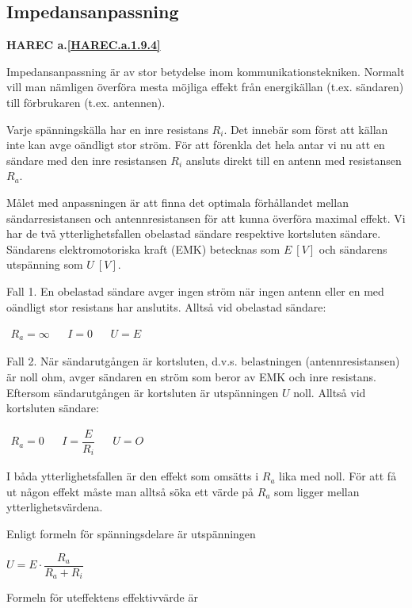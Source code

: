 \subsection{Impedansanpassning}
\textbf{HAREC a.\ref{HAREC.a.1.9.4}\label{myHAREC.a.1.9.4}}

Impedansanpassning är av stor betydelse inom kommunikationstekniken.
Normalt vill man nämligen överföra mesta möjliga effekt från energikällan
(t.ex. sändaren) till förbrukaren (t.ex. antennen).

Varje spänningskälla har en inre resistans \(R_i\). Det innebär som först att
källan inte kan avge oändligt stor ström. För att förenkla det hela antar vi nu
att en sändare med den inre resistansen \(R_i\) ansluts direkt till en antenn
med resistansen \(R_a\).

Målet med anpassningen är att finna det optimala förhållandet mellan
sändarresistansen och antennresistansen för att kunna överföra maximal effekt.
Vi har de två ytterlighetsfallen obelastad sändare respektive kortsluten
sändare. Sändarens elektromotoriska kraft (EMK) betecknas som \(E\ [V]\) och
sändarens utspänning som \(U\ [V]\).

Fall 1.
En obelastad sändare avger ingen ström när ingen antenn eller en med oändligt
stor resistans har anslutits.
Alltså vid obelastad sändare:

\(
\begin{array}{lllll}
R_a = \infty & & I = 0 & & U = E
\end{array}
\)

Fall 2.
När sändarutgången är kortsluten, d.v.s. belastningen (antennresistansen) är
noll ohm, avger sändaren en ström som beror av EMK och inre resistans. Eftersom
sändarutgången är kortsluten är utspänningen \(U\) noll.
Alltså vid kortsluten sändare:

\(
\begin{array}{lllll}
R_a = 0 & & I = \dfrac{E}{R_i} & & U = O
\end{array}
\)

I båda ytterlighetsfallen är den effekt som omsätts i \(R_a\) lika med noll.
För att få ut någon effekt måste man alltså söka ett värde på \(R_a\) som
ligger mellan ytterlighetsvärdena.

Enligt formeln för spänningsdelare är utspänningen

\(U = E \cdot \dfrac{R_a}{R_a+R_i}\)

Formeln för uteffektens effektivvärde är


